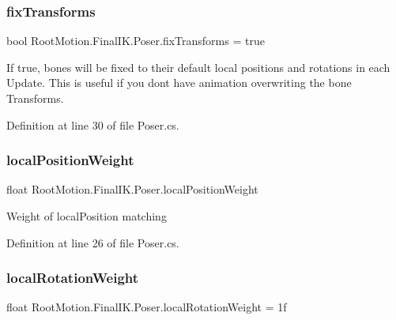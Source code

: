 \subsubsection{\texorpdfstring{fix\+Transforms}{fixTransforms}}
{\footnotesize\ttfamily bool Root\+Motion.\+Final\+I\+K.\+Poser.\+fix\+Transforms = true}



If true, bones will be fixed to their default local positions and rotations in each Update. This is useful if you don\textquotesingle{}t have animation overwriting the bone Transforms. 



Definition at line 30 of file Poser.\+cs.

\mbox{\label{class_root_motion_1_1_final_i_k_1_1_poser_a11cac4a9c5dc5db9337e94a30202af3a}} 
\subsubsection{\texorpdfstring{local\+Position\+Weight}{localPositionWeight}}
{\footnotesize\ttfamily float Root\+Motion.\+Final\+I\+K.\+Poser.\+local\+Position\+Weight}



Weight of local\+Position matching 



Definition at line 26 of file Poser.\+cs.

\mbox{\label{class_root_motion_1_1_final_i_k_1_1_poser_ab3de4b9258766840623d60d706bfcbf8}} 
\subsubsection{\texorpdfstring{local\+Rotation\+Weight}{localRotationWeight}}
{\footnotesize\ttfamily float Root\+Motion.\+Final\+I\+K.\+Poser.\+local\+Rotation\+Weight = 1f}



